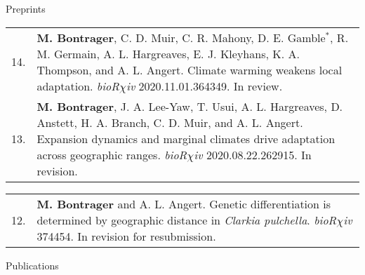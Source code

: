 \documentclass[letterpaper,11pt,oneside]{article}
\begin{document}
\noindent\Large{Preprints} 
\normalsize
\bigskip

\def\arraystretch{1.4}
\noindent \begin{tabular}{@{} p{0.5cm} >{\raggedright\arraybackslash}p{16.7cm}}
14. & \textbf{M. Bontrager}, C. D. Muir, C. R. Mahony, D. E. Gamble$^{*}$, R. M. Germain, A. L. Hargreaves, E. J. Kleyhans, K. A. Thompson, and A. L. Angert. Climate warming weakens local adaptation. \textit{bioR$\chi$iv} 2020.11.01.364349. In review. \\
13. & \textbf{M. Bontrager}, J. A. Lee-Yaw, T. Usui, A. L. Hargreaves, D. Anstett, H. A. Branch, C. D. Muir, and A. L. Angert. Expansion dynamics and marginal climates drive adaptation across geographic ranges. \textit{bioR$\chi$iv} 2020.08.22.262915. In revision. \\
 \end{tabular}
 
 \smallskip
 
 \def\arraystretch{1.4}
\noindent \begin{tabular}{@{} p{0.5cm} >{\raggedright\arraybackslash}p{16.7cm}}
12. & \textbf{M. Bontrager} and A. L. Angert. Genetic differentiation is determined by geographic distance in \textit{Clarkia pulchella}. \textit{bioR$\chi$iv} 374454. In revision for resubmission. \\
\end{tabular}

\bigskip
\bigskip
\smallskip




\noindent\Large{Publications}  
\normalsize
\bigskip
\end{document}
